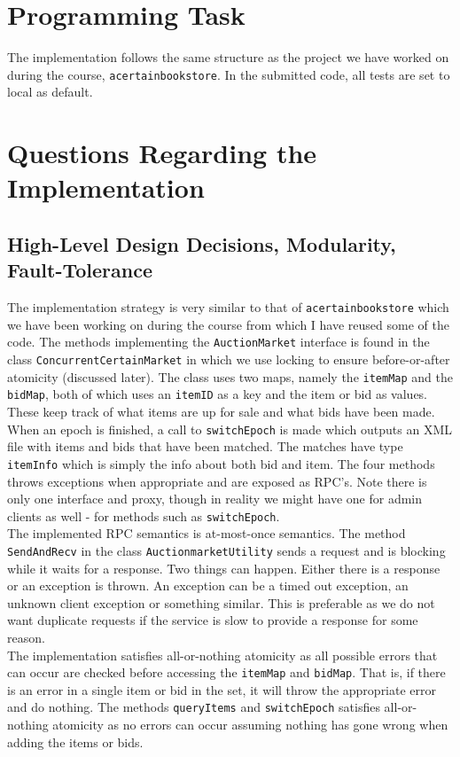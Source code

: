 \documentclass[a4paper]{article}
\begin{document}
\section{Programming Task}
The implementation follows the same structure as the project we have worked on during the course, \texttt{acertainbookstore}. In the submitted code, all tests are set to local as default.

\section{Questions Regarding the Implementation}

\subsection{High-Level Design Decisions, Modularity, Fault-Tolerance}
The implementation strategy is very similar to that of \texttt{acertainbookstore} which we have been working on during the course from which I have reused some of the code. The methods implementing the \texttt{AuctionMarket} interface is found in the class \texttt{ConcurrentCertainMarket} in which we use locking to ensure before-or-after atomicity (discussed later). The class uses two maps, namely the \texttt{itemMap} and the \texttt{bidMap}, both of which uses an \texttt{itemID} as a key and the item or bid as values. These keep track of what items are up for sale and what bids have been made. When an epoch is finished, a call to \texttt{switchEpoch} is made which outputs an XML file with items and bids that have been matched. The matches have type \texttt{itemInfo} which is simply the info about both bid and item. The four methods throws exceptions when appropriate and are exposed as RPC's. Note there is only one interface and proxy, though in reality we might have one for admin clients as well - for methods such as \texttt{switchEpoch}. \\
The implemented RPC semantics is at-most-once semantics. The method \texttt{SendAndRecv} in the class \texttt{AuctionmarketUtility} sends a request and is blocking while it waits for a response. Two things can happen. Either there is a response or an exception is thrown. An exception can be a timed out exception, an unknown client exception or something similar. This is preferable as we do not want duplicate requests if the service is slow to provide a response for some reason. \\
The implementation satisfies all-or-nothing atomicity as all possible errors that can occur are checked before accessing the \texttt{itemMap} and \texttt{bidMap}. That is, if there is an error in a single item or bid in the set, it will throw the appropriate error and do nothing. The methods \texttt{queryItems} and \texttt{switchEpoch} satisfies all-or-nothing atomicity as no errors can occur assuming nothing has gone wrong when adding the items or bids. \\
\end{document}
